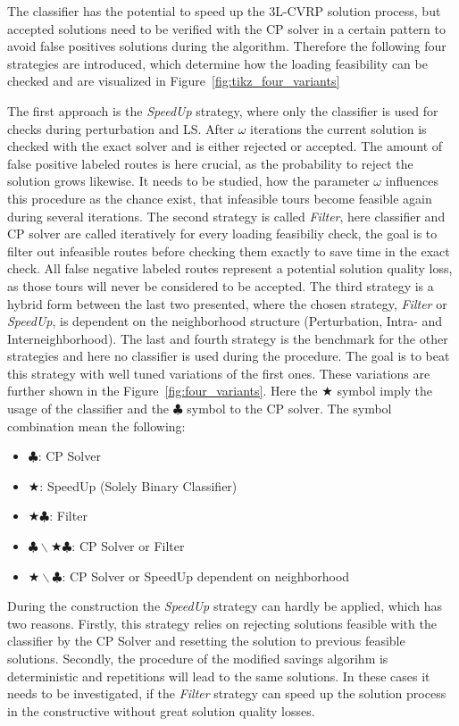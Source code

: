 The classifier has the potential to speed up the \gls{3L-CVRP} solution process, but accepted solutions need to be
verified with the \gls{CP} solver in a certain pattern to avoid false positives solutions during the algorithm.
Therefore the following four strategies are introduced, which determine how the loading feasibility can be checked and are
visualized in Figure~\ref{fig:tikz_four_variants}

The first approach is the \textit{SpeedUp} strategy, where only the classifier is used for checks during perturbation and
\gls{LS}. After $\omega$ iterations the current solution is checked with the exact solver and is either rejected or accepted.
The amount of false positive labeled routes is here crucial, as the probability to reject the solution grows likewise. It needs
to be studied, how the parameter $\omega$ influences this procedure as the chance exist, that infeasible tours become feasible
again during several iterations.
The second strategy is called \textit{Filter}, here classifier and \gls{CP} solver are called iteratively for every loading
feasibiliy check, the goal is to filter out infeasible routes before checking them exactly to save time in the exact check.
All false negative labeled routes represent a potential solution quality loss, as those tours will never be considered to be accepted.
The third strategy is a hybrid form between the last two presented, where the chosen strategy, \textit{Filter} or \textit{SpeedUp},
is dependent on the neighborhood structure (Perturbation, Intra- and Interneighborhood). The last and fourth strategy is the benchmark
for the other strategies and here no classifier is used during the procedure. The goal is to beat this strategy with well tuned
variations of the first ones. These variations are further shown in the Figure~\ref{fig:four_variants}. Here the $\bigstar$ symbol imply
the usage of the classifier and the $\clubsuit$ symbol to the \gls{CP} solver. The symbol combination mean the following:
\begin{itemize}
    \item $\clubsuit$: \gls{CP} Solver
    \item $\bigstar$: SpeedUp (Solely Binary Classifier)
    \item $\bigstar\clubsuit$: Filter
    \item \(\clubsuit \backslash \bigstar\clubsuit\): \gls{CP} Solver or Filter
    \item \(\bigstar\backslash\clubsuit\): \gls{CP} Solver or SpeedUp dependent on neighborhood
\end{itemize}

During the construction the \textit{SpeedUp} strategy can hardly be applied, which has two reasons. Firstly, this strategy relies
on rejecting solutions feasible with the classifier by the \gls{CP} Solver and resetting the solution to previous feasible solutions.
Secondly, the procedure of the modified savings algorihm is deterministic and repetitions will lead to the same solutions. In these
cases it needs to be investigated, if the \textit{Filter} strategy can speed up the solution process in the constructive without
great solution quality losses.


